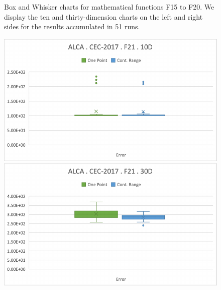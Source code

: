 \documentclass[graybox]{svmult}
\begin{document}
\begin{figure}[!ht]
        \caption{Box and Whisker charts for mathematical functions F15 to F20. We display the ten and thirty-dimension charts on the left and right sides for the results accumulated in 51 runs.} \label{fig.experiment_F15-F20}
    \end{figure}

    \FloatBarrier

    \begin{figure}[!ht]
        \begin{minipage}[h]{0.49\linewidth}
            \includegraphics[width=1\linewidth]{img/fig_experiment_F21x10D.pdf} 
        \end{minipage}
        \hfill
        \vspace{0.05 cm}
        \begin{minipage}[h]{0.49\linewidth}
            \includegraphics[width=1\linewidth]{img/fig_experiment_F21x30D.pdf} 
        \end{minipage}
        \vfill
        \vspace{0.05 cm}
        \begin{minipage}[h]{0.49\linewidth}

\end{minipage}
\end{figure}
\end{document}
